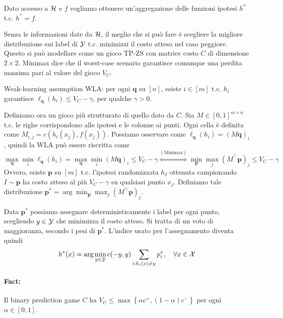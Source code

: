 Dato accesso a $\mathcal{H}$ e $f$ vogliamo ottenere un'aggregazione delle funzioni ipotesi $h^\ast$ t.c. $h^\ast = f$.

Senza le informazioni date da $\mathcal{H}$, il meglio che si può fare è scegliere la migliore distribuzione sui label di $\mathcal{Y}$ t.c. minimizzi il costo atteso nel caso peggiore. Questo si può modellare come un gioco TP-ZS con matrice costo $C$ di dimensione $2 \times 2$. Minimax dice che il worst-case scenario garantisce comunque una perdita massima pari al valore del gioco $V_C$.

Weak-learning assumption WLA: per ogni $\bm q$ su $[n]$, esiste $i \in [m]$ t.c. $h_i$ garantisce $\ell_{\bm q} (h_i) \leq V_C - \gamma$, per qualche $\gamma > 0$.

Definiamo ora un gioco più strutturato di quello dato da $C$. Sia $M \in [0,1]^{m \times n}$ t.c. le righe corrispondono alle ipotesi e le colonne ai punti. Ogni cella è definita come $M_{i,j} = c(h_i (x_j), f (x_j))$. Possiamo osservare come $\ell_{\bm q} (h_i) = (M \bm q)_i$, quindi la WLA può essere riscritta come
$$ \max_{\bm q} \min_i \ell_{\bm q} (h_i) = \max_{\bm q} \min_i (M \bm q)_i \leq V_C - \gamma \stackrel{(\text{Minimax})}{\Longleftrightarrow} \min_{\bm p} \max_j (M^\top \bm p)_j \leq V_C - \gamma $$
Ovvero, esiste $\bm p$ su $[m]$ t.c. l'ipotesi randomizzata $h_I$ ottenuta campionando $I \sim \bm p$ ha costo atteso al più $V_C - \gamma$ su qualsiasi punto $x_j$. Definiamo tale distribuzione $\bm p^\ast = \arg \min_{\bm p} \max_j (M^\top \bm p)_j$.

Data $\bm p^\ast$ possiamo assegnare deterministicamente i label per ogni punto, scegliendo $y \in \mathcal{Y}$ che minimizza il costo atteso. Si tratta di un voto di maggioranza, secondo i pesi di $\bm p^\ast$. L'indice usato per l'assegnamento diventa quindi
$$ h^\ast (x) = \arg \min_{y \in \mathcal{Y}} c (-y, y) \sum_{i: h_i(x) \neq y} p_i^\ast, \quad \forall x \in \mathcal{X} $$

\paragraph{Fact:} Il binary prediction game $C$ ha $V_C \leq \max \left\{\alpha c^+, (1 - \alpha) c^-\right\}$ per ogni $\alpha \in [0,1]$.


